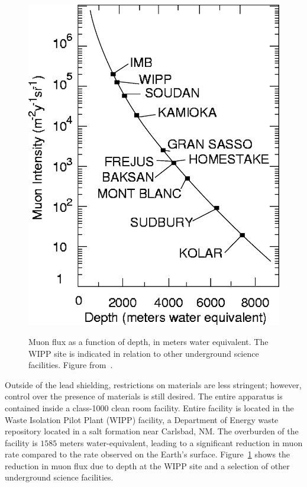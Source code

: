 \begin{figure}
\begin{center}
\includegraphics[keepaspectratio=true,width=\textwidth]{muonflux.eps}
\end{center}
\renewcommand{\baselinestretch}{1}
\small\normalsize
\begin{quote}
\caption{Muon flux as a function of depth, in meters water equivalent.  The WIPP site is indicated in relation to other underground science facilities.  Figure from~\cite{Esch2005516}.}
\label{fig:MuonFluxVsDepth}
\end{quote}
\end{figure}
\renewcommand{\baselinestretch}{2}
\small\normalsize

Outside of the lead shielding, restrictions on materials are less stringent; however, control over the presence of materials is still desired.  The entire apparatus is contained inside a class-1000 clean room facility.  Entire facility is located in the Waste Isolation Pilot Plant (WIPP) facility, a Department of Energy waste repository located in a salt formation near Carlsbad, NM.  The overburden of the facility is $1585$ meters water-equivalent, leading to a significant reduction in muon rate compared to the rate observed on the Earth's surface.  Figure~\ref{fig:MuonFluxVsDepth} shows the reduction in muon flux due to depth at the WIPP site and a selection of other underground science facilities.

